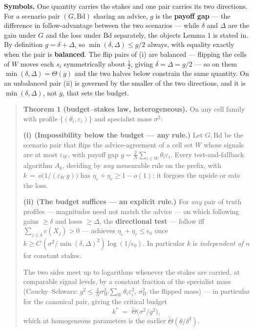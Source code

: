 \textbf{Symbols.} One quantity carries the stakes and one pair carries
its two directions. For a scenario pair \((G,\mathrm{Bd})\) sharing an
advice, \(g\) is the \textbf{payoff gap} --- the difference in
follow-advantage between the two scenarios --- while \(\delta\) and
\(\Delta\) are the gain under \(G\) and the loss under \(\mathrm{Bd}\)
separately, the objects Lemma 1 is stated in. By definition
\(g=\delta+\Delta\), so \(\min(\delta,\Delta)\le g/2\) always, with
equality exactly when the pair is \textbf{balanced}. The flip pairs of
(i) are balanced --- flipping the cells of \(W\) moves each \(s_i\)
symmetrically about \(\tfrac12\), giving \(\delta=\Delta=g/2\) --- so on
them \(\min(\delta,\Delta)=\Theta(g)\) and the two halves below
constrain the same quantity. On an unbalanced pair (ii) is governed by
the smaller of the two directions, and it is \(\min(\delta,\Delta)\),
not \(g\), that sets the budget.

\begin{quote}
\textbf{Theorem 1 (budget--stakes law, heterogeneous).} On any cell
family with profile \(\{(\theta_i,\varepsilon_i)\}\) and specialist mass
\(\sigma^2\):

\textbf{(i) (Impossibility below the budget --- any rule.)} Let
\(G,\mathrm{Bd}\) be the scenario pair that flips the advice-agreement
of a cell set \(W\) whose signals are at most \(\varepsilon_W\), with
payoff gap \(g=\tfrac2N\sum_{i\in W}\theta_i\varepsilon_i\). Every
test-and-fallback algorithm \(A_k\), deciding by \emph{any} measurable
rule on the prefix, with \(k \,=\, o\!\big(1/(\varepsilon_W\,g)\big)\)
has \(\eta_c+\eta_r \ge 1-o(1)\): it forgoes the upside or eats the
loss.

\textbf{(ii) (The budget suffices --- an explicit rule.)} For \emph{any}
pair of truth profiles --- magnitudes need not match the advice --- on
which following gains \(\ge\delta\) and loses \(\ge\Delta\), the
\textbf{directional test} --- follow iff \(\sum_{j\le k} c(X_j) > 0\)
--- achieves \(\eta_c+\eta_r \le \epsilon_0\) once
\(k \ge C\,(\sigma^2/\min(\delta,\Delta)^2)\log(1/\epsilon_0)\). In
particular \(k\) is \emph{independent of \(n\)} for constant stakes.

The two sides meet up to logarithms whenever the stakes are carried, at
comparable signal levels, by a constant fraction of the specialist mass
(Cauchy--Schwarz:
\(g^2 \le \tfrac4N\sigma^2_W\sum_W\theta_i\varepsilon_i^2\),
\(\sigma^2_W\) the flipped mass) --- in particular for the canonical
pair, giving the critical budget
\[k^* \;=\; \tilde\Theta\!\big(\sigma^2/g^2\big),\] which at homogeneous
parameters is the earlier \(\tilde\Theta(\theta/\delta^2)\).
\end{quote}

